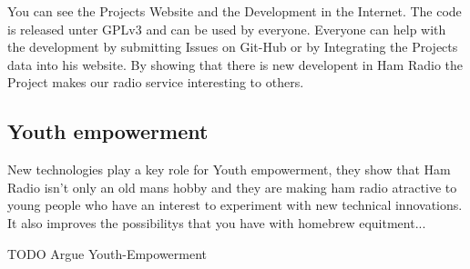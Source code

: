 You can see the Projects Website and the Development in the Internet. The 
code is released unter GPLv3 and can be used by everyone. Everyone can help 
with the development by submitting Issues on Git-Hub or by Integrating the 
Projects data into his website. By showing that there is new developent in Ham 
Radio the Project makes our radio service interesting to others.


\subsection{Youth empowerment}

New technologies play a key role for Youth empowerment, they show that Ham Radio 
isn't only an old mans hobby and they are making ham radio atractive to young people 
who have an interest to experiment with new technical innovations. It also improves 
the possibilitys that you have with homebrew equitment...

TODO Argue Youth-Empowerment



